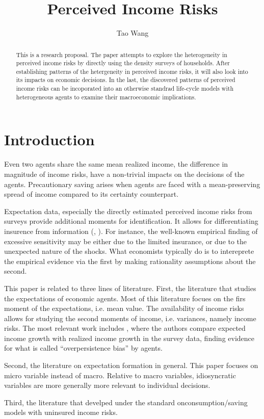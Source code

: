 \documentclass[]{article}
\title{Perceived Income Risks}
\author{Tao Wang}
\begin{document}
\maketitle

\begin{abstract}
This is a research proposal. The paper attempts to explore the heterogeneity in perceived income risks by directly using the density surveys of households. After establishing patterns of the hetergeneity in perceived income risks, it will also look into its impacts on economic decisions. In the last, the discovered patterns of perceived income risks can be incoporated into an otherwise standrad life-cycle models with heterogeneous agents to examine their macroeconomic implications. 
 
\end{abstract}

\section{Introduction}


Even two agents share the same mean realized income, the difference in magnitude of income risks, have a non-trivial impacts on the decisions of the agents. Precautionary saving arises when agents are faced with a mean-preserving spread of income compared to its certainty counterpart. 

Expectation data, especially the directly estimated perceived income risks from surveys provide additional moments for identification. It allows for differentiating insurence from information (\citet{kaufmann2009disentangling}, \citet{meghir2011earnings}). For instance, the well-known empirical finding of excessive sensitivity may be either due to the limited insurance, or due to the unexpected nature of the shocks. What economists typically do is to intereprete the empirical evidence via the first by making rationality assumptions about the second. 

This paper is related to three lines of literature. First, the literature that studies the expectations of economic agents. Most of this literature focues on the firs moment of the expectations, i.e. mean value. The availability of income risks allows for studying the second moments of income, i.e. variances, namely income risks. The most relevant work includes \citet{rozsypal2017overpersistence}, where the authors compare expected income growth with realized income growth in the survey data, finding evidence for what is called ``overpersistence bias'' by agents. 

Second, the literature on expectation formation in general. This paper focuses on micro variable instead of macro. Relative to macro variables, idiosyncratic variables are more generally more relevant to individual decisions. 

Third, the literature that develped under the standard onconsumption/saving models with uninsured income risks. 




\end{document}

